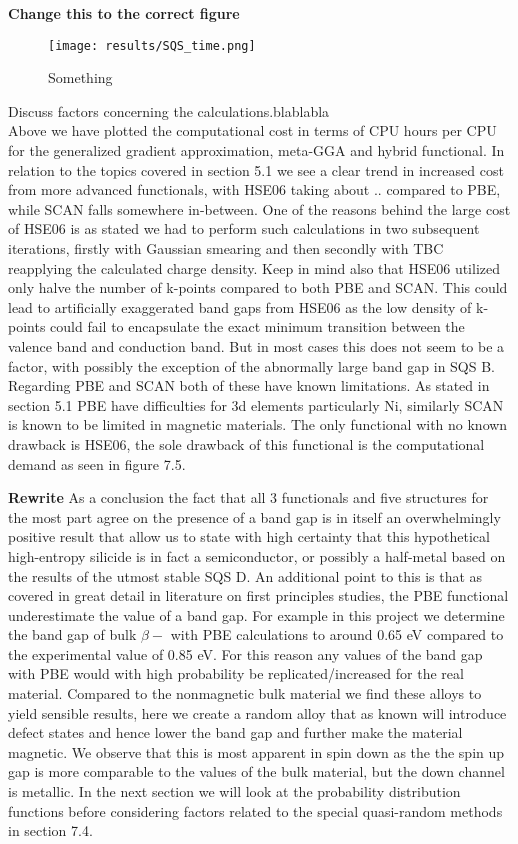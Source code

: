 \textbf{Change this to the correct figure}
\begin{figure}[H]
\centering
\texttt{[image: results/SQS\_time.png]}
\caption{Something}
\end{figure}


Discuss factors concerning the calculations.blablabla \\



Above we have plotted the computational cost in terms of CPU hours per CPU for the generalized gradient approximation, meta-GGA and hybrid functional. In relation to the topics covered in section 5.1 we see a clear trend in increased cost from more advanced functionals, with HSE06 taking about .. compared to PBE, while SCAN falls somewhere in-between. One of the reasons behind the large cost of HSE06 is as stated we had to perform such calculations in two subsequent iterations, firstly with Gaussian smearing and then secondly with TBC reapplying the calculated charge density. Keep in mind also that HSE06 utilized only halve the number of k-points compared to both PBE and SCAN. This could lead to artificially exaggerated band gaps from HSE06 as the low density of k-points could fail to encapsulate the exact minimum transition between the valence band and conduction band. But in most cases this does not seem to be a factor, with possibly the exception of the abnormally large band gap in SQS B. Regarding PBE and SCAN both of these have known limitations. As stated in section 5.1 PBE have difficulties for 3d elements particularly Ni, similarly SCAN is known to be limited in magnetic materials. The only functional with no known drawback is HSE06, the sole drawback of this functional is the computational demand as seen in figure 7.5.

\textbf{Rewrite}
As a conclusion the fact that all 3 functionals and five structures for the most part agree on the presence of a band gap is in itself an overwhelmingly positive result that allow us to state with high certainty that this hypothetical high-entropy silicide  is in fact a semiconductor, or possibly a half-metal based on the results of the utmost stable SQS D. An additional point to this is that as covered in great detail in literature on first principles studies, the PBE functional underestimate the value of a band gap. For example in this project we determine the band gap of bulk $\beta-$ with PBE calculations to around 0.65 eV compared to the experimental value of 0.85 eV. For this reason any values of the band gap with PBE would with high probability be replicated/increased for the real material. Compared to the nonmagnetic bulk material we find these alloys to yield sensible results, here we create a random alloy that as known will introduce defect states and hence lower the band gap and further make the material magnetic. We observe that this is most apparent in spin down as the the spin up gap is more comparable to the values of the bulk material, but the down channel is metallic. In the next section we will look at the probability distribution functions before considering factors related to the special quasi-random methods in section 7.4. 


